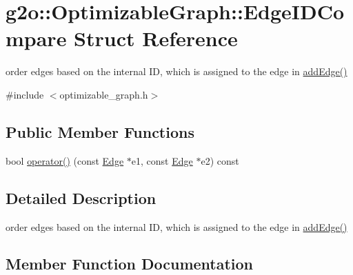 \hypertarget{structg2o_1_1_optimizable_graph_1_1_edge_i_d_compare}{}\section{g2o\+:\+:Optimizable\+Graph\+:\+:Edge\+I\+D\+Compare Struct Reference}
\label{structg2o_1_1_optimizable_graph_1_1_edge_i_d_compare}


order edges based on the internal ID, which is assigned to the edge in \mbox{\hyperlink{structg2o_1_1_optimizable_graph_a6831ed69fce3dba691f53302a2813070}{add\+Edge()}}  




{\ttfamily \#include $<$optimizable\+\_\+graph.\+h$>$}

\subsection*{Public Member Functions}
\begin{DoxyCompactItemize}
\item 
bool \mbox{\hyperlink{structg2o_1_1_optimizable_graph_1_1_edge_i_d_compare_acce61a97e66e611d79fcc1b758fc7336}{operator()}} (const \mbox{\hyperlink{classg2o_1_1_optimizable_graph_1_1_edge}{Edge}} $\ast$e1, const \mbox{\hyperlink{classg2o_1_1_optimizable_graph_1_1_edge}{Edge}} $\ast$e2) const
\end{DoxyCompactItemize}


\subsection{Detailed Description}
order edges based on the internal ID, which is assigned to the edge in \mbox{\hyperlink{structg2o_1_1_optimizable_graph_a6831ed69fce3dba691f53302a2813070}{add\+Edge()}} 

\subsection{Member Function Documentation}
\mbox{\label{structg2o_1_1_optimizable_graph_1_1_edge_i_d_compare_acce61a97e66e611d79fcc1b758fc7336}} 
